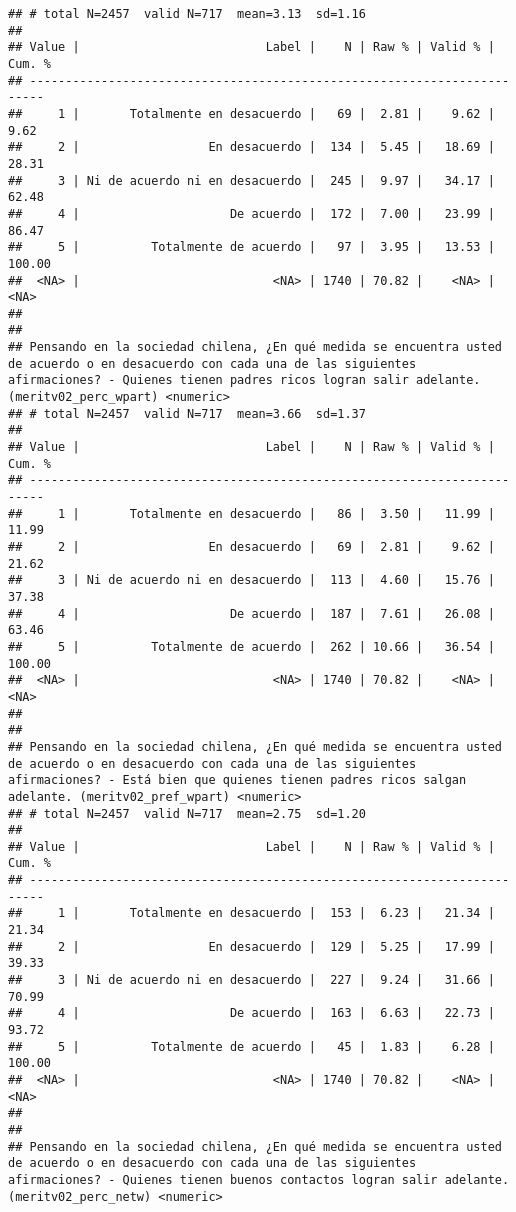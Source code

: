 \documentclass[
  10,
  landscape,
  legalpaper]{article}
\begin{document}
\begin{verbatim}
## # total N=2457  valid N=717  mean=3.13  sd=1.16
## 
## Value |                          Label |    N | Raw % | Valid % | Cum. %
## ------------------------------------------------------------------------
##     1 |       Totalmente en desacuerdo |   69 |  2.81 |    9.62 |   9.62
##     2 |                  En desacuerdo |  134 |  5.45 |   18.69 |  28.31
##     3 | Ni de acuerdo ni en desacuerdo |  245 |  9.97 |   34.17 |  62.48
##     4 |                     De acuerdo |  172 |  7.00 |   23.99 |  86.47
##     5 |          Totalmente de acuerdo |   97 |  3.95 |   13.53 | 100.00
##  <NA> |                           <NA> | 1740 | 70.82 |    <NA> |   <NA>
## 
## 
## Pensando en la sociedad chilena, ¿En qué medida se encuentra usted de acuerdo o en desacuerdo con cada una de las siguientes afirmaciones? - Quienes tienen padres ricos logran salir adelante. (meritv02_perc_wpart) <numeric>
## # total N=2457  valid N=717  mean=3.66  sd=1.37
## 
## Value |                          Label |    N | Raw % | Valid % | Cum. %
## ------------------------------------------------------------------------
##     1 |       Totalmente en desacuerdo |   86 |  3.50 |   11.99 |  11.99
##     2 |                  En desacuerdo |   69 |  2.81 |    9.62 |  21.62
##     3 | Ni de acuerdo ni en desacuerdo |  113 |  4.60 |   15.76 |  37.38
##     4 |                     De acuerdo |  187 |  7.61 |   26.08 |  63.46
##     5 |          Totalmente de acuerdo |  262 | 10.66 |   36.54 | 100.00
##  <NA> |                           <NA> | 1740 | 70.82 |    <NA> |   <NA>
## 
## 
## Pensando en la sociedad chilena, ¿En qué medida se encuentra usted de acuerdo o en desacuerdo con cada una de las siguientes afirmaciones? - Está bien que quienes tienen padres ricos salgan adelante. (meritv02_pref_wpart) <numeric>
## # total N=2457  valid N=717  mean=2.75  sd=1.20
## 
## Value |                          Label |    N | Raw % | Valid % | Cum. %
## ------------------------------------------------------------------------
##     1 |       Totalmente en desacuerdo |  153 |  6.23 |   21.34 |  21.34
##     2 |                  En desacuerdo |  129 |  5.25 |   17.99 |  39.33
##     3 | Ni de acuerdo ni en desacuerdo |  227 |  9.24 |   31.66 |  70.99
##     4 |                     De acuerdo |  163 |  6.63 |   22.73 |  93.72
##     5 |          Totalmente de acuerdo |   45 |  1.83 |    6.28 | 100.00
##  <NA> |                           <NA> | 1740 | 70.82 |    <NA> |   <NA>
## 
## 
## Pensando en la sociedad chilena, ¿En qué medida se encuentra usted de acuerdo o en desacuerdo con cada una de las siguientes afirmaciones? - Quienes tienen buenos contactos logran salir adelante. (meritv02_perc_netw) <numeric>

\end{verbatim}
\end{document}

